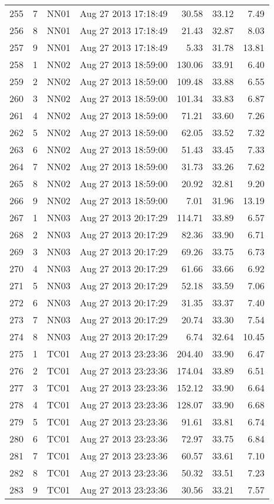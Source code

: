 \documentclass{article}
\begin{document}
\begin{longtable}{ccllrrr}
255&7&NN01&Aug 27 2013 17:18:49&30.58&33.12&7.49\\
256&8&NN01&Aug 27 2013 17:18:49&21.43&32.87&8.03\\
257&9&NN01&Aug 27 2013 17:18:49&5.33&31.78&13.81\\
\hline 
258&1&NN02&Aug 27 2013 18:59:00&130.06&33.91&6.40\\
259&2&NN02&Aug 27 2013 18:59:00&109.48&33.88&6.55\\
260&3&NN02&Aug 27 2013 18:59:00&101.34&33.83&6.87\\
261&4&NN02&Aug 27 2013 18:59:00&71.21&33.60&7.26\\
262&5&NN02&Aug 27 2013 18:59:00&62.05&33.52&7.32\\
263&6&NN02&Aug 27 2013 18:59:00&51.43&33.45&7.33\\
264&7&NN02&Aug 27 2013 18:59:00&31.73&33.26&7.62\\
265&8&NN02&Aug 27 2013 18:59:00&20.92&32.81&9.20\\
266&9&NN02&Aug 27 2013 18:59:00&7.01&31.96&13.19\\
\hline 
267&1&NN03&Aug 27 2013 20:17:29&114.71&33.89&6.57\\
268&2&NN03&Aug 27 2013 20:17:29&82.36&33.90&6.71\\
269&3&NN03&Aug 27 2013 20:17:29&69.26&33.75&6.73\\
270&4&NN03&Aug 27 2013 20:17:29&61.66&33.66&6.92\\
271&5&NN03&Aug 27 2013 20:17:29&52.18&33.59&7.06\\
272&6&NN03&Aug 27 2013 20:17:29&31.35&33.37&7.40\\
273&7&NN03&Aug 27 2013 20:17:29&20.74&33.30&7.54\\
274&8&NN03&Aug 27 2013 20:17:29&6.74&32.64&10.45\\
\hline 
275&1&TC01&Aug 27 2013 23:23:36&204.40&33.90&6.47\\
276&2&TC01&Aug 27 2013 23:23:36&174.04&33.89&6.51\\
277&3&TC01&Aug 27 2013 23:23:36&152.12&33.90&6.64\\
278&4&TC01&Aug 27 2013 23:23:36&128.07&33.90&6.68\\
279&5&TC01&Aug 27 2013 23:23:36&91.61&33.81&6.74\\
280&6&TC01&Aug 27 2013 23:23:36&72.97&33.75&6.84\\
281&7&TC01&Aug 27 2013 23:23:36&60.57&33.61&7.10\\
282&8&TC01&Aug 27 2013 23:23:36&50.32&33.51&7.23\\
283&9&TC01&Aug 27 2013 23:23:36&30.56&33.21&7.57\\

\end{longtable}
\end{document}
